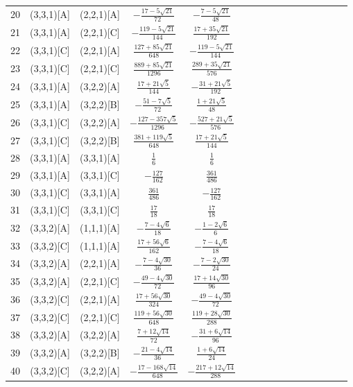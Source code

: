 \documentclass[11pt]{article}
\begin{document}
\begin{longtable}{ | p{1cm}| *{15}{c|} }
20 & (3,3,1)[A] & (2,2,1)[A] & $-\frac{17-5\sqrt{21}}{72}$ & $-\frac{7-5\sqrt{21}}{48}$\\
21 & (3,3,1)[A] & (2,2,1)[C] & $-\frac{119-5\sqrt{21}}{144}$ & $\frac{17+35\sqrt{21}}{192}$\\
22 & (3,3,1)[C] & (2,2,1)[A] & $\frac{127+85\sqrt{21}}{648}$ & $-\frac{119-5\sqrt{21}}{144}$\\
23 & (3,3,1)[C] & (2,2,1)[C] & $\frac{889+85\sqrt{21}}{1296}$ & $\frac{289+35\sqrt{21}}{576}$\\
24 & (3,3,1)[A] & (3,2,2)[A] & $\frac{17+21\sqrt{5}}{144}$ & $-\frac{31+21\sqrt{5}}{192}$\\
25 & (3,3,1)[A] & (3,2,2)[B] & $-\frac{51-7\sqrt{5}}{72}$ & $\frac{1+21\sqrt{5}}{48}$\\
26 & (3,3,1)[C] & (3,2,2)[A] & $-\frac{127-357\sqrt{5}}{1296}$ & $-\frac{527+21\sqrt{5}}{576}$\\
27 & (3,3,1)[C] & (3,2,2)[B] & $\frac{381+119\sqrt{5}}{648}$ & $\frac{17+21\sqrt{5}}{144}$\\
28 & (3,3,1)[A] & (3,3,1)[A] & $\frac{1}{6}$ & $\frac{1}{6}$\\
29 & (3,3,1)[A] & (3,3,1)[C] & $-\frac{127}{162}$ & $\frac{361}{486}$\\
30 & (3,3,1)[C] & (3,3,1)[A] & $\frac{361}{486}$ & $-\frac{127}{162}$\\
31 & (3,3,1)[C] & (3,3,1)[C] & $\frac{17}{18}$ & $\frac{17}{18}$\\
32 & (3,3,2)[A] & (1,1,1)[A] & $-\frac{7-4\sqrt{6}}{18}$ & $-\frac{1-2\sqrt{6}}{6}$\\
33 & (3,3,2)[C] & (1,1,1)[A] & $\frac{17+56\sqrt{6}}{162}$ & $-\frac{7-4\sqrt{6}}{18}$\\
34 & (3,3,2)[A] & (2,2,1)[A] & $-\frac{7-4\sqrt{30}}{36}$ & $-\frac{7-2\sqrt{30}}{24}$\\
35 & (3,3,2)[A] & (2,2,1)[C] & $-\frac{49-4\sqrt{30}}{72}$ & $\frac{17+14\sqrt{30}}{96}$\\
36 & (3,3,2)[C] & (2,2,1)[A] & $\frac{17+56\sqrt{30}}{324}$ & $-\frac{49-4\sqrt{30}}{72}$\\
37 & (3,3,2)[C] & (2,2,1)[C] & $\frac{119+56\sqrt{30}}{648}$ & $\frac{119+28\sqrt{30}}{288}$\\
38 & (3,3,2)[A] & (3,2,2)[A] & $\frac{7+12\sqrt{14}}{72}$ & $-\frac{31+6\sqrt{14}}{96}$\\
39 & (3,3,2)[A] & (3,2,2)[B] & $-\frac{21-4\sqrt{14}}{36}$ & $\frac{1+6\sqrt{14}}{24}$\\
40 & (3,3,2)[C] & (3,2,2)[A] & $-\frac{17-168\sqrt{14}}{648}$ & $-\frac{217+12\sqrt{14}}{288}$\\

\end{longtable}
\end{document}
